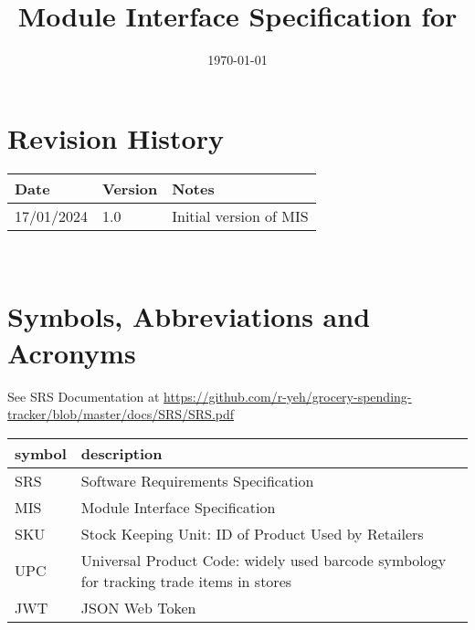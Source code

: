 \documentclass[12pt, titlepage]{article}
\begin{document}
\title{Module Interface Specification for \progname{}}

\author{\authname}

\date{\today}

\maketitle


\section{Revision History}

\begin{tabularx}{\textwidth}{p{3cm}p{2cm}X}
\toprule {\bf Date} & {\bf Version} & {\bf Notes}\\
\midrule
17/01/2024 & 1.0 & Initial version of MIS\\
\bottomrule
\end{tabularx}

~\newpage

\section{Symbols, Abbreviations and Acronyms}

See SRS Documentation at \url{https://github.com/r-yeh/grocery-spending-tracker/blob/master/docs/SRS/SRS.pdf}
\newline
\renewcommand{\arraystretch}{1.2}
\begin{tabular}{l l} 
  \toprule		
  \textbf{symbol} & \textbf{description}\\
  \midrule 
  SRS & Software Requirements Specification\\
  MIS & Module Interface Specification \\
  SKU & Stock Keeping Unit: ID of Product Used by Retailers \\
  UPC & Universal Product Code: widely used barcode symbology for tracking trade items in stores \\
  JWT & JSON Web Token \\
  \bottomrule
\end{tabular}\\

\newpage

\tableofcontents

\newpage

\end{document}
